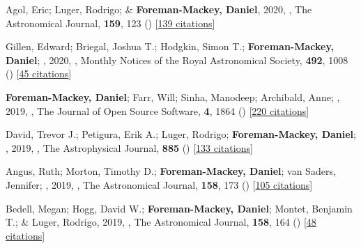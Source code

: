\item[{\color{numcolor}\scriptsize53}] Agol, Eric; Luger, Rodrigo; \& \textbf{Foreman-Mackey, Daniel}, 2020, , The Astronomical Journal, \textbf{159}, 123 () [\href{https://ui.adsabs.harvard.edu/abs/2020AJ....159..123A}{139 citations}]

\item[{\color{numcolor}\scriptsize52}] Gillen, Edward; Briegal, Joshua T.; Hodgkin, Simon T.; \textbf{Foreman-Mackey, Daniel}; \etal, 2020, , Monthly Notices of the Royal Astronomical Society, \textbf{492}, 1008 () [\href{https://ui.adsabs.harvard.edu/abs/2020MNRAS.492.1008G}{45 citations}]

\item[{\color{numcolor}\scriptsize51}] \textbf{Foreman-Mackey, Daniel}; Farr, Will; Sinha, Manodeep; Archibald, Anne; \etal, 2019, , The Journal of Open Source Software, \textbf{4}, 1864 () [\href{https://ui.adsabs.harvard.edu/abs/2019JOSS....4.1864F}{220 citations}]

\item[{\color{numcolor}\scriptsize50}] David, Trevor J.; Petigura, Erik A.; Luger, Rodrigo; \textbf{Foreman-Mackey, Daniel}; \etal, 2019, , The Astrophysical Journal, \textbf{885} () [\href{https://ui.adsabs.harvard.edu/abs/2019ApJ...885L..12D}{133 citations}]

\item[{\color{numcolor}\scriptsize49}] Angus, Ruth; Morton, Timothy D.; \textbf{Foreman-Mackey, Daniel}; van Saders, Jennifer; \etal, 2019, , The Astronomical Journal, \textbf{158}, 173 () [\href{https://ui.adsabs.harvard.edu/abs/2019AJ....158..173A}{105 citations}]

\item[{\color{numcolor}\scriptsize48}] Bedell, Megan; Hogg, David W.; \textbf{Foreman-Mackey, Daniel}; Montet, Benjamin T.; \& Luger, Rodrigo, 2019, , The Astronomical Journal, \textbf{158}, 164 () [\href{https://ui.adsabs.harvard.edu/abs/2019AJ....158..164B}{48 citations}]

